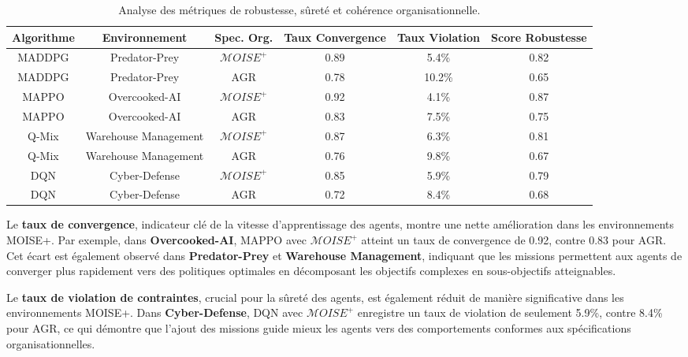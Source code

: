 \documentclass[sigconf,anonymous]{aamas}
\begin{document}
\begin{table*}[h!]
    \centering
    \caption{Analyse des métriques de robustesse, sûreté et cohérence organisationnelle.}
    \label{tab:other_metrics}
    \begin{tabular}{|c|c|c|c|c|c|}
        \hline
        \textbf{Algorithme} & \textbf{Environnement} & \textbf{Spec. Org.} & \textbf{Taux Convergence} & \textbf{Taux Violation} & \textbf{Score Robustesse} \\ \hline
        MADDPG & Predator-Prey & $\mathcal{M}OISE^+$ & 0.89 & 5.4\% & 0.82 \\ \hline
        MADDPG & Predator-Prey & AGR & 0.78 & 10.2\% & 0.65 \\ \hline
        MAPPO & Overcooked-AI & $\mathcal{M}OISE^+$ & 0.92 & 4.1\% & 0.87 \\ \hline
        MAPPO & Overcooked-AI & AGR & 0.83 & 7.5\% & 0.75 \\ \hline
        Q-Mix & Warehouse Management & $\mathcal{M}OISE^+$ & 0.87 & 6.3\% & 0.81 \\ \hline
        Q-Mix & Warehouse Management & AGR & 0.76 & 9.8\% & 0.67 \\ \hline
        DQN & Cyber-Defense & $\mathcal{M}OISE^+$ & 0.85 & 5.9\% & 0.79 \\ \hline
        DQN & Cyber-Defense & AGR & 0.72 & 8.4\% & 0.68 \\ \hline
    \end{tabular}
\end{table*}

Le \textbf{taux de convergence}, indicateur clé de la vitesse d'apprentissage des agents, montre une nette amélioration dans les environnements MOISE+. Par exemple, dans \textbf{Overcooked-AI}, MAPPO avec $\mathcal{M}OISE^+$ atteint un taux de convergence de 0.92, contre 0.83 pour AGR. Cet écart est également observé dans \textbf{Predator-Prey} et \textbf{Warehouse Management}, indiquant que les missions permettent aux agents de converger plus rapidement vers des politiques optimales en décomposant les objectifs complexes en sous-objectifs atteignables.

Le \textbf{taux de violation de contraintes}, crucial pour la sûreté des agents, est également réduit de manière significative dans les environnements MOISE+. Dans \textbf{Cyber-Defense}, DQN avec $\mathcal{M}OISE^+$ enregistre un taux de violation de seulement 5.9\%, contre 8.4\% pour AGR, ce qui démontre que l'ajout des missions guide mieux les agents vers des comportements conformes aux spécifications organisationnelles.
\end{document}
